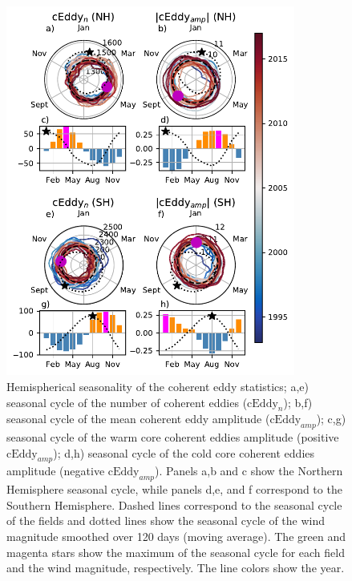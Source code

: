 \documentclass[draft,linenumbers]{agujournal2019}
\newcommand{\cEddy}{\textrm{cEddy}}
\begin{document}
	\begin{figure}
	    \centering
	    \includegraphics[width=95mm]{figures/All_polar_plots_eddy_stats_polarity_V3.pdf}
	    \caption{Hemispherical seasonality of the coherent eddy statistics;
		a,e) seasonal cycle of the number of coherent eddies ($\cEddy_n$); b,f) seasonal cycle of the mean coherent eddy amplitude ($\cEddy_{amp}$); c,g) seasonal cycle of the warm core coherent eddies amplitude (positive $\cEddy_{amp}$); d,h) seasonal cycle of the cold core coherent eddies amplitude (negative $\cEddy_{amp}$). Panels a,b and c show the Northern Hemisphere seasonal cycle, while panels d,e, and f correspond to the Southern Hemisphere. Dashed lines correspond to the seasonal cycle of the fields and dotted lines show the seasonal cycle of the wind magnitude smoothed over 120 days (moving average). The green and magenta stars show the maximum of the seasonal cycle for each field and the wind magnitude, respectively. The line colors show the year.}
	    \label{fig:eddy_stats}
	\end{figure}
\end{document}
